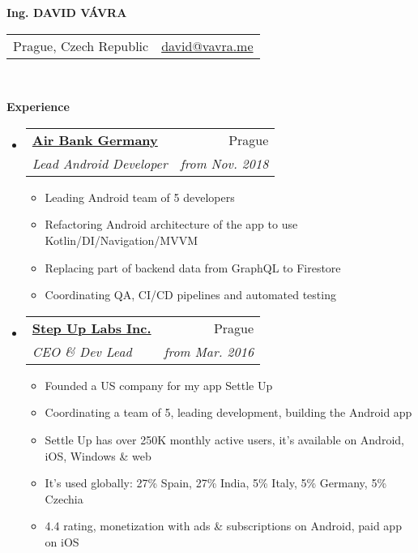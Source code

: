 \documentclass[letterpaper,11pt]{article}
\makeatletter
\newcommand{\resitem}[1]{\item #1 \vspace{-2pt}}
\newcommand{\resheading}[1]{{\large \colorbox{mygrey}{\begin{minipage}{\textwidth}{\textbf{#1 \vphantom{p\^{E}}}}\end{minipage}}}}
\newcommand{\ressubheading}[4]{
\begin{tabular*}{6.5in}{l@{\extracolsep{\fill}}r}
		\textbf{#1} & #2 \\
		\textit{#3} & \textit{#4} \\
\end{tabular*}\vspace{-6pt}}
\makeatother
\begin{document}
\newcommand{\myheader}{
\begin{center}
\textbf{\Huge Ing. DAVID VÁVRA}
\end{center} 
\begin{tabular*}{7in}{l@{\extracolsep{\fill}}r}
	Prague, Czech Republic &  \href{mailto:david@vavra.me}{david@vavra.me} \\
	\end{tabular*}
\\
\vspace{0.1in}}

\myheader



\resheading{Experience}
	\begin{itemize}
	\item 
			\ressubheading{\href{https://airbank.net}{Air Bank Germany}}{Prague}{Lead Android Developer}{from Nov. 2018}
				{ \footnotesize
				\begin{itemize}
					\resitem{Leading Android team of 5 developers }
					\resitem{Refactoring Android architecture of the app to use Kotlin/DI/Navigation/MVVM }
					\resitem{Replacing part of backend data from GraphQL to Firestore}
					\resitem{Coordinating QA, CI/CD pipelines and automated testing}
					
				\end{itemize}
				}	
	\item 
			\ressubheading{\href{https://stepuplabs.io}{Step Up Labs Inc.}}{Prague}{CEO \& Dev Lead}{from Mar. 2016}
				{ \footnotesize
				\begin{itemize}
					\resitem{Founded a US company for my app Settle Up}
					\resitem{Coordinating a team of 5, leading development, building the Android app}
					\resitem{Settle Up has over 250K monthly active users, it's available on Android, iOS, Windows \& web}
					\resitem{It's used globally: 27\% Spain, 27\% India, 5\% Italy, 5\% Germany, 5\% Czechia}
					\resitem{4.4 rating, monetization with ads \& subscriptions on Android, paid app on iOS}
					

\end{itemize}}
\end{itemize}
\end{document}
